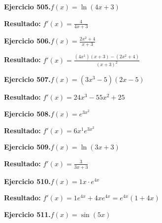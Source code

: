 \documentclass[10pt,a4paper]{article}
\begin{document}
\newpage
\begin{ejbox}
\textbf{Ejercicio 505.}\quad $f(x) = \ln(4x + 3)$
\end{ejbox}

\begin{solbox}
\textbf{Resultado:} \(\displaystyle f'(x) = \frac{4}{4x + 3}\)
\end{solbox}

\begin{ejbox}
\textbf{Ejercicio 506.}\quad $f(x) = \frac{2x^{2} +4}{x + 3}$
\end{ejbox}

\begin{solbox}
\textbf{Resultado:} \(\displaystyle f'(x) = \frac{(4x^{1})(x+3) - (2x^{2} +4)}{(x+3)^2}\)
\end{solbox}

\begin{ejbox}
\textbf{Ejercicio 507.}\quad $f(x) = (3x^{3} -5)(2x -5)$
\end{ejbox}

\begin{solbox}
\textbf{Resultado:} \(\displaystyle f'(x) = 24x^{3} -55x^{2} +25\)
\end{solbox}

\newpage
\begin{ejbox}
\textbf{Ejercicio 508.}\quad $f(x) = e^{3x^{2}}$
\end{ejbox}

\begin{solbox}
\textbf{Resultado:} \(\displaystyle f'(x) = 6x^{1}e^{3x^{2}}\)
\end{solbox}

\begin{ejbox}
\textbf{Ejercicio 509.}\quad $f(x) = \ln(3x + 3)$
\end{ejbox}

\begin{solbox}
\textbf{Resultado:} \(\displaystyle f'(x) = \frac{3}{3x + 3}\)
\end{solbox}

\begin{ejbox}
\textbf{Ejercicio 510.}\quad $f(x) = 1x \cdot e^{4x}$
\end{ejbox}

\begin{solbox}
\textbf{Resultado:} \(\displaystyle f'(x) = 1e^{4x} + 4xe^{4x} = e^{4x}(1 + 4x)\)
\end{solbox}

\newpage
\begin{ejbox}
\textbf{Ejercicio 511.}\quad $f(x) = \sin(5x)$
\end{ejbox}
\end{document}
